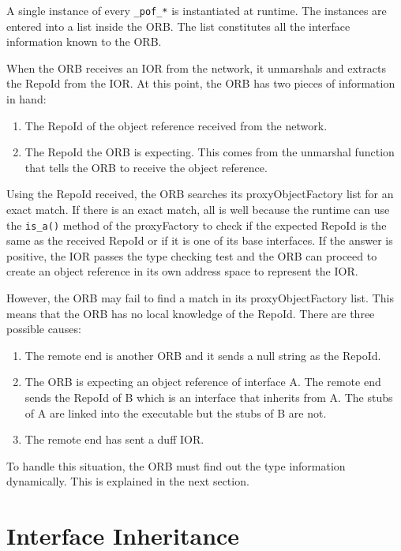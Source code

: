 \documentclass[11pt,twoside,a4paper]{book}
\newcommand{\type}[1]{\texttt{#1}}
\newcommand{\op}[1]{\texttt{#1()}}
\begin{document}
A single instance of every \type{\_pof\_*} is instantiated at runtime.
The instances are entered into a list inside the ORB. The list
constitutes all the interface information known to the ORB.

When the ORB receives an IOR from the network, it unmarshals and
extracts the RepoId from the IOR. At this point, the ORB has two
pieces of information in hand:

\begin{enumerate}
\item The RepoId of the object reference received from the network.
\item The RepoId the ORB is expecting. This comes from the unmarshal
      function that tells the ORB to receive the object reference.
\end{enumerate}

Using the RepoId received, the ORB searches its proxyObjectFactory
list for an exact match. If there is an exact match, all is well
because the runtime can use the \op{is\_a} method of the proxyFactory
to check if the expected RepoId is the same as the received RepoId or
if it is one of its base interfaces. If the answer is positive, the
IOR passes the type checking test and the ORB can proceed to create an
object reference in its own address space to represent the IOR.

However, the ORB may fail to find a match in its proxyObjectFactory
list. This means that the ORB has no local knowledge of the RepoId.
There are three possible causes:

\begin{enumerate}
\item The remote end is another ORB and it sends a null string as the RepoId.
\item The ORB is expecting an object reference of interface A. The remote
      end sends the RepoId of B which is an interface that inherits from A.
      The stubs of A are linked into the executable but the stubs of B are
      not.
\item The remote end has sent a duff IOR.
\end{enumerate}

To handle this situation, the ORB must find out the type information
dynamically. This is explained in the next section.

\section{Interface Inheritance}
\end{document}
